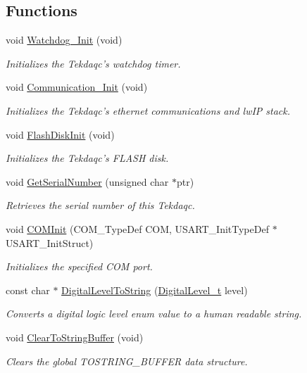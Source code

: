 \subsection*{Functions}
\begin{DoxyCompactItemize}
\item 
void \hyperlink{group__tekdaqc__configuration_ga495a07bd1939981855363ee899e619ed}{Watchdog\-\_\-\-Init} (void)
\begin{DoxyCompactList}\small\item\em Initializes the Tekdaqc's watchdog timer. \end{DoxyCompactList}\item 
void \hyperlink{group__tekdaqc__configuration_ga77b9940dbe07de4765c23c27baf1de40}{Communication\-\_\-\-Init} (void)
\begin{DoxyCompactList}\small\item\em Initializes the Tekdaqc's ethernet communications and lw\-I\-P stack. \end{DoxyCompactList}\item 
void \hyperlink{group__tekdaqc__configuration_ga38dfe3d6b1f6f3da8b74612f51b0f479}{Flash\-Disk\-Init} (void)
\begin{DoxyCompactList}\small\item\em Initializes the Tekdaqc's F\-L\-A\-S\-H disk. \end{DoxyCompactList}\item 
void \hyperlink{group__tekdaqc__configuration_gabd78ed6a110b5878ee2388cb706ada9a}{Get\-Serial\-Number} (unsigned char $\ast$ptr)
\begin{DoxyCompactList}\small\item\em Retrieves the serial number of this Tekdaqc. \end{DoxyCompactList}\item 
void \hyperlink{group__tekdaqc__configuration_gaec08ef6f9e4d5e29da8f7af0490930b7}{C\-O\-M\-Init} (C\-O\-M\-\_\-\-Type\-Def C\-O\-M, U\-S\-A\-R\-T\-\_\-\-Init\-Type\-Def $\ast$U\-S\-A\-R\-T\-\_\-\-Init\-Struct)
\begin{DoxyCompactList}\small\item\em Initializes the specified C\-O\-M port. \end{DoxyCompactList}\item 
const char $\ast$ \hyperlink{group__tekdaqc__configuration_ga5aeffa7a603f954a637f967f37c29ec6}{Digital\-Level\-To\-String} (\hyperlink{group__board__channel__constants_gaee574a0d48c41a3e5426ffbf8ac4c5c4}{Digital\-Level\-\_\-t} level)
\begin{DoxyCompactList}\small\item\em Converts a digital logic level enum value to a human readable string. \end{DoxyCompactList}\item 
void \hyperlink{group__tekdaqc__configuration_ga7fee54fd2d4e5ad001547a64d519bdb1}{Clear\-To\-String\-Buffer} (void)
\begin{DoxyCompactList}\small\item\em Clears the global T\-O\-S\-T\-R\-I\-N\-G\-\_\-\-B\-U\-F\-F\-E\-R data structure. \end{DoxyCompactList}\end{DoxyCompactItemize}


